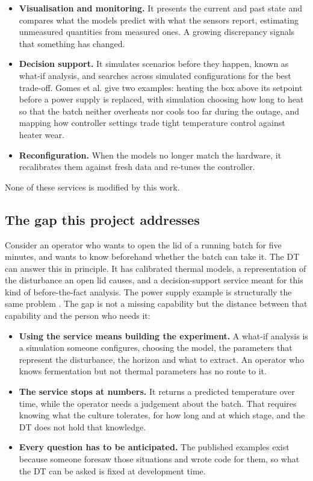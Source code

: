   \begin{itemize}
    \item \textbf{Visualisation and monitoring.} It presents the current and past state and
      compares what the models predict with what the sensors report, estimating unmeasured
      quantities from measured ones. A growing discrepancy signals that something has changed.
    \item \textbf{Decision support.} It simulates scenarios before they happen, known as what-if
      analysis, and searches across simulated configurations for the best trade-off. Gomes et al.
      give two examples: heating the box above its setpoint before a power supply is replaced, with
      simulation choosing how long to heat so that the batch neither overheats nor cools too far
      during the outage, and mapping how controller settings trade tight temperature control
      against heater wear.
    \item \textbf{Reconfiguration.} When the models no longer match the hardware, it recalibrates
      them against fresh data and re-tunes the controller.
  \end{itemize}

  None of these services is modified by this work.

  \subsection{The gap this project addresses}
  \label{sec:gap}

  Consider an operator who wants to open the lid of a running batch for five minutes, and wants to
  know beforehand whether the batch can take it. The DT can answer this in principle. It has
  calibrated thermal models, a representation of the disturbance an open lid causes, and a
  decision-support service meant for this kind of before-the-fact analysis. The power supply
  example is structurally the same problem \cite{gomes2025incubator}. The gap is not a missing
  capability but the distance between that capability and the person who needs it:

  \begin{itemize}
    \item \textbf{Using the service means building the experiment.} A what-if analysis is a
      simulation someone configures, choosing the model, the parameters that represent the
      disturbance, the horizon and what to extract. An operator who knows fermentation but not
      thermal parameters has no route to it.
    \item \textbf{The service stops at numbers.} It returns a predicted temperature over time,
      while the operator needs a judgement about the batch. That requires knowing what the culture
      tolerates, for how long and at which stage, and the DT does not hold that knowledge.
    \item \textbf{Every question has to be anticipated.} The published examples exist because
      someone foresaw those situations and wrote code for them, so what the DT can be asked is
      fixed at development time.
  \end{itemize}

